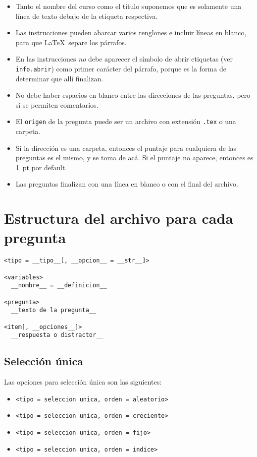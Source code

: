 \documentclass[12pt]{article}
\theoremstyle{definition}
\begin{document}
\begin{itemize}
  \item Tanto el nombre del curso como el título suponemos que es solamente una línea de texto debajo de la etiqueta respectiva.
  \item Las instrucciones pueden abarcar varios renglones e incluir líneas en blanco, para que \LaTeX\ separe los párrafos. 
  \item En las instrucciones \emph{no} debe aparecer el símbolo de abrir etiquetas (ver \verb|info.abrir|) como primer car\'acter del p\'arrafo, porque es la forma de determinar que all\'i finalizan.
  \item No debe haber espacios en blanco entre las direcciones de las preguntas, pero sí se permiten comentarios.
  \item El \verb|origen| de la pregunta puede ser un archivo con extensión \verb|.tex| o una carpeta.
  \item Si la dirección es una carpeta, entonces el puntaje para cualquiera de las preguntas es el mismo, y se toma de acá. Si el puntaje no aparece, entonces es 1~pt por default.
  \item Las preguntas finalizan con una línea en blanco o con el final del archivo.
\end{itemize}

\section{Estructura del archivo para cada pregunta}

\begin{verbatim}
<tipo = __tipo__[, __opcion__ = __str__]>

<variables>
  __nombre__ = __definicion__

<pregunta>
  __texto de la pregunta__

<item[, __opciones__]>
  __respuesta o distractor__
\end{verbatim}

\subsection{Selección única}
Las opciones para selección única son las siguientes:
\begin{itemize}
  \item \verb|<tipo = seleccion unica, orden = aleatorio>|
  \item \verb|<tipo = seleccion unica, orden = creciente>|
  \item \verb|<tipo = seleccion unica, orden = fijo>|
  \item \verb|<tipo = seleccion unica, orden = indice>|
\end{itemize}
\end{document}
